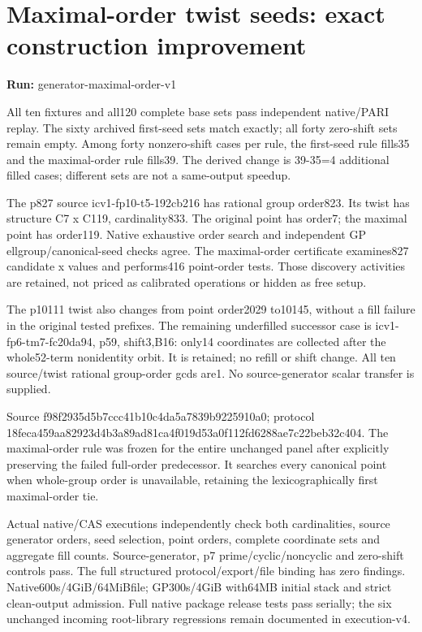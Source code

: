 \documentclass[10pt]{article}
\begin{document}
\section*{Maximal-order twist seeds: exact construction improvement}
\textbf{Run:} generator-maximal-order-v1\par
All ten fixtures and all120 complete base sets pass independent native/PARI replay. The sixty archived first-seed sets match exactly; all forty zero-shift sets remain empty. Among forty nonzero-shift cases per rule, the first-seed rule fills35 and the maximal-order rule fills39. The derived change is 39-35=4 additional filled cases; different sets are not a same-output speedup.

The p827 source icv1-fp10-t5-192cb216 has rational group order823. Its twist has structure C7 x C119, cardinality833. The original point has order7; the maximal point has order119. Native exhaustive order search and independent GP ellgroup/canonical-seed checks agree. The maximal-order certificate examines827 candidate x values and performs416 point-order tests. Those discovery activities are retained, not priced as calibrated operations or hidden as free setup.

The p10111 twist also changes from point order2029 to10145, without a fill failure in the original tested prefixes. The remaining underfilled successor case is icv1-fp6-tm7-fc20da94, p59, shift3,B16: only14 coordinates are collected after the whole52-term nonidentity orbit. It is retained; no refill or shift change. All ten source/twist rational group-order gcds are1. No source-generator scalar transfer is supplied.

Source f98f2935\allowbreak{}d5b7ccc4\allowbreak{}1b10c4da\allowbreak{}5a7839b9\allowbreak{}225910a0; protocol 18feca45\allowbreak{}9aa82923\allowbreak{}d4b3a89a\allowbreak{}d81ca4f0\allowbreak{}19d53a0f\allowbreak{}112fd628\allowbreak{}8ae7c22b\allowbreak{}eb32c404. The maximal-order rule was frozen for the entire unchanged panel after explicitly preserving the failed full-order predecessor. It searches every canonical point when whole-group order is unavailable, retaining the lexicographically first maximal-order tie.

Actual native/CAS executions independently check both cardinalities, source generator orders, seed selection, point orders, complete coordinate sets and aggregate fill counts. Source-generator, p7 prime/cyclic/noncyclic and zero-shift controls pass. The full structured protocol/export/file binding has zero findings. Native600s/4GiB/64MiBfile; GP300s/4GiB with64MB initial stack and strict clean-output admission. Full native package release tests pass serially; the six unchanged incoming root-library regressions remain documented in execution-v4.
\end{document}
